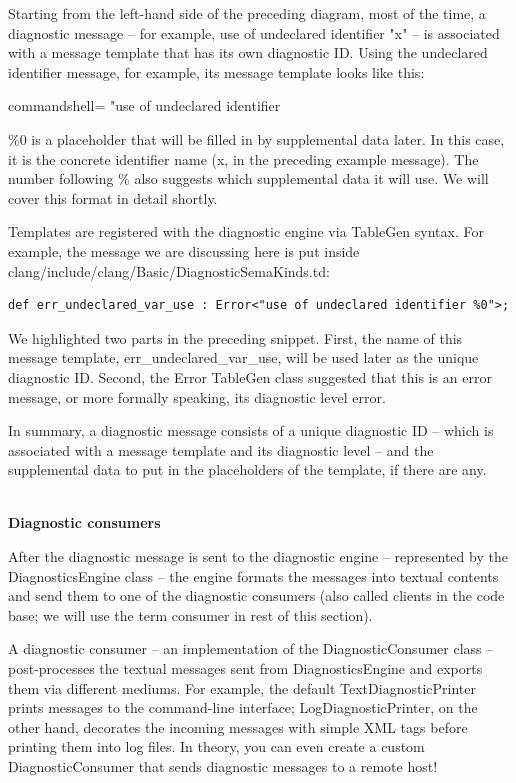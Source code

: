 Starting from the left-hand side of the preceding diagram, most of the time, a diagnostic message – for example, use of undeclared identifier "x" – is associated with a message template that has its own diagnostic ID. Using the undeclared identifier message, for example, its message template looks like this:

\begin{tcblisting}{commandshell={}}
"use of undeclared identifier %
\end{tcblisting}

\%0 is a placeholder that will be filled in by supplemental data later. In this case, it is the concrete identifier name (x, in the preceding example message). The number following \% also suggests which supplemental data it will use. We will cover this format in detail shortly.

Templates are registered with the diagnostic engine via TableGen syntax. For example, the message we are discussing here is put inside clang/include/clang/Basic/DiagnosticSemaKinds.td:

\begin{lstlisting}[style=stylePython]
def err_undeclared_var_use : Error<"use of undeclared identifier %0">;
\end{lstlisting}

We highlighted two parts in the preceding snippet. First, the name of this message template, err\_undeclared\_var\_use, will be used later as the unique diagnostic ID. Second, the Error TableGen class suggested that this is an error message, or more formally speaking, its diagnostic level error.

In summary, a diagnostic message consists of a unique diagnostic ID – which is associated with a message template and its diagnostic level – and the supplemental data to put in the placeholders of the template, if there are any.

\hspace*{\fill} \\ %
\noindent
\textbf{Diagnostic consumers}

After the diagnostic message is sent to the diagnostic engine – represented by the DiagnosticsEngine class – the engine formats the messages into textual contents and send them to one of the diagnostic consumers (also called clients in the code base; we will use the term consumer in rest of this section).

A diagnostic consumer – an implementation of the DiagnosticConsumer class – post-processes the textual messages sent from DiagnosticsEngine and exports them via different mediums. For example, the default TextDiagnosticPrinter prints messages to the command-line interface; LogDiagnosticPrinter, on the other hand, decorates the incoming messages with simple XML tags before printing them into log files. In theory, you can even create a custom DiagnosticConsumer that sends diagnostic messages to a remote host!

